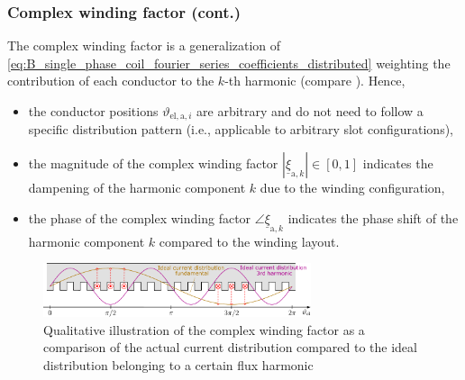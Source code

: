 \begin{frame}
	\frametitle{Complex winding factor (cont.)}
    The complex winding factor is a generalization of \eqref{eq:B_single_phase_coil_fourier_series_coefficients_distributed} weighting the contribution of each conductor to the $k$-th harmonic (compare ). Hence,
    \begin{itemize}
        \item<2-> the conductor positions $\vartheta_{\mathrm{el},\mathrm{a},i}$ are arbitrary and do not need to follow a specific distribution pattern (i.e., applicable to arbitrary slot configurations),
        \item<3-> the magnitude of the complex winding factor $|\underline{\xi}_{\mathrm{a},k}|\in[0,1]$ indicates the dampening of the harmonic component $k$ due to the winding configuration,
        \item<4-> the phase of the complex winding factor $\angle \underline{\xi}_{\mathrm{a},k}$ indicates the phase shift of the harmonic component $k$ compared to the winding layout. 
    \end{itemize}
    \begin{figure}
        \centering
        \includegraphics[width=0.7\textwidth]{fig/lec05/Representation_complex_winding_factor.pdf}
        \caption{Qualitative illustration of the complex winding factor as a comparison of the actual current distribution compared to the ideal distribution belonging to a certain flux harmonic}
        \label{fig:Representation_complex_winding_factor}
    \end{figure}
\end{frame}


